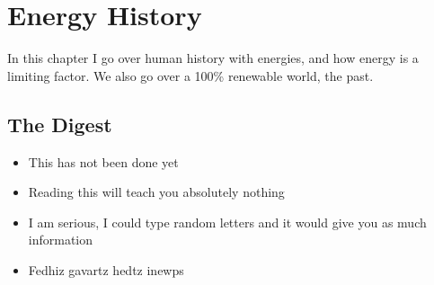 \setchapterpreamble[u]{\margintoc}
\chapter{Energy History}

In this chapter I go over human history with energies, and how energy is a limiting factor. We also go over a 100\% renewable world, the past.


\blindtext


\section{The Digest}

\begin{kaoboxgreen}[frametitle=Main Takeaways]

\begin{itemize}
\item This has not been done yet
\item Reading this will teach you absolutely nothing
\item I am serious, I could type random letters and it would give you as much information
\item Fedhiz gavartz hedtz inewps
\end{itemize}
  
\end{kaoboxgreen}